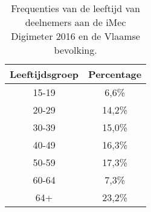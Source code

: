 \begin{table}
  \caption{Frequenties van de leeftijd van deelnemers aan de iMec Digimeter 2016 en de Vlaamse bevolking.}
  \label{tab:frequenties-leeftijden}
  \centering
  \begin{tabular}{cc}
    \textbf{Leeftijdsgroep} & \textbf{Percentage} \\ \midrule
    15-19 & 6,6\% \\
    20-29 & 14,2\% \\
    30-39 & 15,0\% \\
    40-49 & 16,3\% \\
    50-59 & 17,3\% \\
    60-64 & 7,3\% \\
    64+   & 23,2\% \\
  \end{tabular}
  \label{tab:digimeter2016}
  

\end{table}
